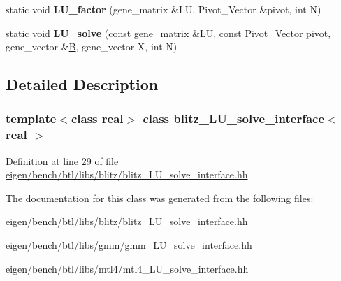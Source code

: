 \begin{DoxyCompactItemize}
\item 
\mbox{\label{classblitz___l_u__solve__interface_a35ac67142990402c20597bf9a8d8d9b9}} 
static void {\bfseries L\+U\+\_\+factor} (gene\+\_\+matrix \&LU, Pivot\+\_\+\+Vector \&pivot, int N)
\item 
\mbox{\label{classblitz___l_u__solve__interface_acb9e0965fe92bb88c1b6d4e2a78906be}} 
static void {\bfseries L\+U\+\_\+solve} (const gene\+\_\+matrix \&LU, const Pivot\+\_\+\+Vector pivot, gene\+\_\+vector \&\hyperlink{group___core___module_class_eigen_1_1_matrix}{B}, gene\+\_\+vector X, int N)
\end{DoxyCompactItemize}


\subsection{Detailed Description}
\subsubsection*{template$<$class real$>$\newline
class blitz\+\_\+\+L\+U\+\_\+solve\+\_\+interface$<$ real $>$}



Definition at line \hyperlink{eigen_2bench_2btl_2libs_2blitz_2blitz___l_u__solve__interface_8hh_source_l00029}{29} of file \hyperlink{eigen_2bench_2btl_2libs_2blitz_2blitz___l_u__solve__interface_8hh_source}{eigen/bench/btl/libs/blitz/blitz\+\_\+\+L\+U\+\_\+solve\+\_\+interface.\+hh}.



The documentation for this class was generated from the following files\+:\begin{DoxyCompactItemize}
\item 
eigen/bench/btl/libs/blitz/blitz\+\_\+\+L\+U\+\_\+solve\+\_\+interface.\+hh\item 
eigen/bench/btl/libs/gmm/gmm\+\_\+\+L\+U\+\_\+solve\+\_\+interface.\+hh\item 
eigen/bench/btl/libs/mtl4/mtl4\+\_\+\+L\+U\+\_\+solve\+\_\+interface.\+hh\end{DoxyCompactItemize}
